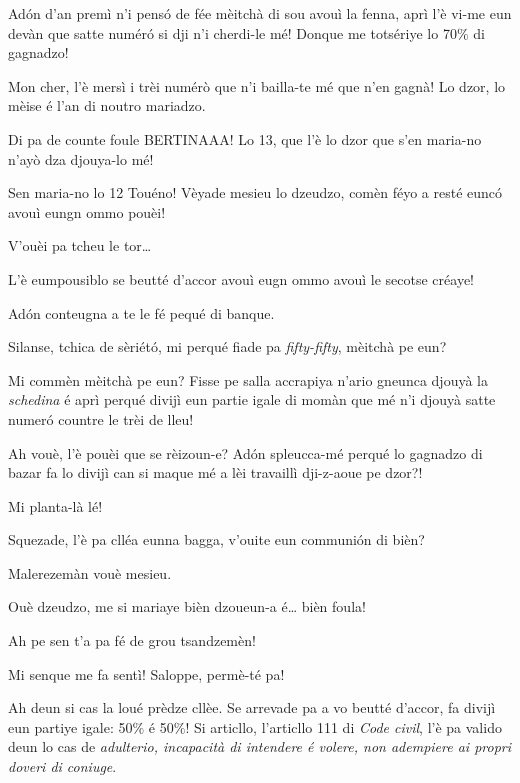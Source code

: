 \begin{drama}
\Tobiespeaks Adón d’an premì n’i pensó de fée mèitchà di sou avouì la fenna, aprì l’è vi-me eun devàn que satte numér\'o si dji n’i cherdi-le mé! Donque me totsériye lo 70$\%$ di gagnadzo!

\Bertinaspeaks Mon cher, l’è mersì i trèi numérò que n’i bailla-te mé que n’en gagnà! Lo dzor, lo mèise é l’an di noutro mariadzo.

\Tobiespeaks Di pa de counte foule BERTINAAA! Lo 13, que l’è lo dzor que s’en maria-no n’ayò dza djouya-lo mé!

\Bertinaspeaks Sen maria-no lo 12 Touéno!  Vèyade mesieu lo dzeudzo, comèn féyo a resté eunc\'o avouì eungn ommo pouèi!

\DzeudzoSenliquerspeaks V'ouèi pa tcheu le tor\ldots

\Bertinaspeaks L’è eumpousiblo se beutté d’accor avouì eugn ommo avouì le secotse créaye!

\Tobiespeaks Adón conteugna a te le fé pequé di banque.

\DzeudzoSenliquerspeaks {} Silanse, tchica de sèriét\'o, mi perqué fiade pa \textit{fifty-fifty}, mèitchà pe eun?

\Tobiespeaks Mi commèn mèitchà pe eun? Fisse pe salla accrapiya n’ario gneunca djouyà la \textit{schedina} é aprì perqué divijì eun partie igale di momàn que mé n'i djouyà satte numer\'o countre le trèi de lleu!

\Bertinaspeaks Ah vouè, l’è pouèi que se rèizoun-e? Ad\'on spleucca-mé perqué lo gagnadzo di bazar fa lo divijì can si maque mé a lèi travaillì dji-z-aoue pe dzor?!

\Tobiespeaks Mi planta-là lé!

\DzeudzoSenliquerspeaks {} Squezade, l’è pa cllé\-a eunna bagga, v'ouite eun communión di bièn?

\Tobiespeaks Malerezemàn vouè mesieu.

\Bertinaspeaks Ouè dzeudzo, me si mariaye bièn dzoueun-a é\ldots {} bièn foula!

\Tobiespeaks Ah pe sen t’a pa fé de grou tsandzemèn!

\Bertinaspeaks Mi senque me fa sentì! Saloppe, permè-té pa!

\DzeudzoSenliquerspeaks {} Ah deun si cas la loué prèdze cllèe. Se arrevade pa a vo beutté d’accor, fa divijì eun partiye igale: 50$\%$ é 50$\%$! Si articllo, l’articllo 111 di \textit{Code civil}, l’è pa valido deun lo cas de  \og \textit{adulterio, incapacità di intendere é volere, non adempiere ai propri doveri di coniuge}\fg .


\end{drama}
